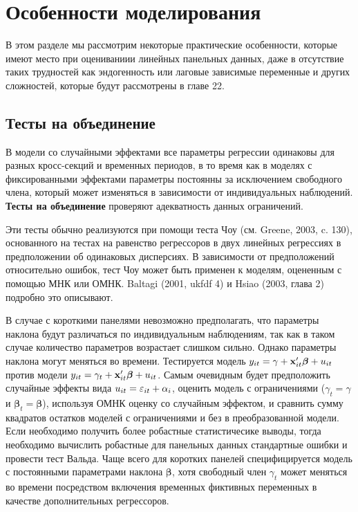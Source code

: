 \section{Особенности моделирования}

В этом разделе мы рассмотрим некоторые практические особенности, которые имеют место при оцениваниии линейных панельных данных, даже в отсутствие таких трудностей как эндогенность или лаговые зависимые переменные и других сложностей, которые будут рассмотрены в главе 22.


\subsection{Тесты на объединение}

В модели со случайными эффектами все параметры регрессии одинаковы для разных кросс-секций и временных периодов, в то время как в моделях с фиксированными эффектами параметры постоянны за исключением свободного члена, который может изменяться в зависимости от индивидуальных наблюдений. \textbf{Тесты на  объединение} проверяют адекватность данных ограничений.

Эти тесты обычно реализуются при помощи теста Чоу (см. Greene, 2003, c. 130), основанного на тестах на равенство регрессоров в двух линейных регрессиях в предположении об одинаковых дисперсиях. В зависимости от предположений относительно ошибок, тест Чоу может быть применен к моделям, оцененным с помощью МНК или ОМНК. Baltagi (2001, ukfdf 4) и Hsiao (2003, глава 2) подробно это описывают.

В случае с короткими панелями невозможно предполагать, что параметры наклона будут различаться по индивидуальным наблюдениям, так как в таком случае количество параметров возрастает слишком сильно. Однако параметры наклона могут меняться во времени. Тестируется модель $y_{it}=\gamma+\mathbf{x}'_{it} \bm\beta+u_{it}$ против модели $y_{it}=\gamma_t+\mathbf{x}'_{it} \bm\beta+u_{it}$. Самым очевидным будет предположить случайные эффекты вида $u_{it}=\varepsilon_{it}+\alpha_i$, оценить модель с ограничениями ($\gamma_t=\gamma$ и $\bm\beta_t=\bm\beta$), используя ОМНК оценку со случайным эффектом, и сравнить сумму квадратов остатков моделей с ограничениями и без в преобразованной модели. Если необходимо получить более робастные статистичесике выводы, тогда необходимо вычислить робастные для панельных данных стандартные ошибки и провести тест Вальда. Чаще всего для коротких панелей специфицируется модель с постоянными параметрами наклона $\bm\beta$, хотя свободный член $\gamma_t$ может меняться во времени посредством включения временных фиктивных переменных в качестве дополнительных регрессоров.

